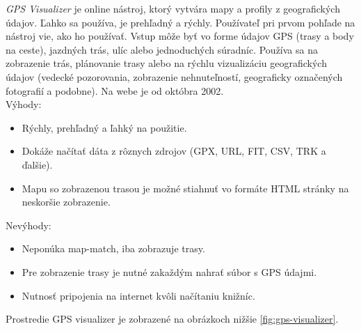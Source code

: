 \indent \indent \textit{GPS Visualizer} je online nástroj, ktorý vytvára mapy a profily z geografických údajov. Ľahko sa používa, je prehľadný a rýchly. Používateľ pri prvom pohľade na nástroj vie, ako ho používať. Vstup môže byť vo forme údajov GPS (trasy a body na ceste), jazdných trás, ulíc alebo jednoduchých súradníc. Používa sa na zobrazenie trás, plánovanie trasy alebo na rýchlu vizualizáciu geografických údajov (vedecké pozorovania, zobrazenie nehnuteľností, geograficky označených fotografií a podobne). Na webe je od októbra 2002\cite{gps_visualizer}.\\
Výhody:
\begin{itemize}
  \item Rýchly, prehľadný a ľahký na použitie.
  \item Dokáže načítať dáta z rôznych zdrojov (GPX, URL, FIT, CSV, TRK a ďalšie).
  \item Mapu so zobrazenou trasou je možné stiahnuť vo formáte HTML stránky na neskoršie zobrazenie.
\end{itemize}
Nevýhody:
\begin{itemize}
  \item Neponúka map-match, iba zobrazuje trasy.
  \item Pre zobrazenie trasy je nutné zakaždým nahrať súbor s GPS údajmi.
  \item Nutnosť pripojenia na internet kvôli načítaniu knižníc.
\end{itemize}
Prostredie GPS visualizer je zobrazené na obrázkoch nižšie \ref{fig:gps-visualizer}.
